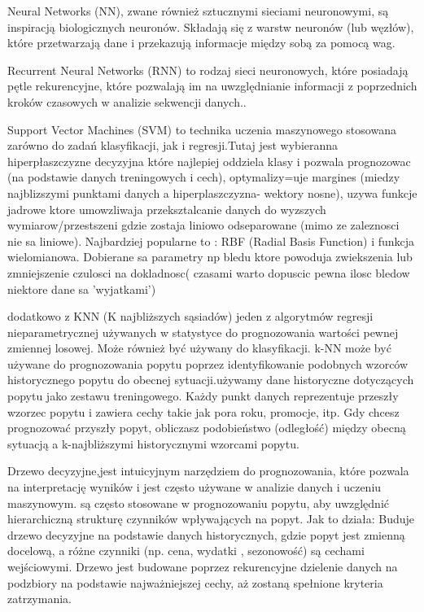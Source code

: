 Neural Networks (NN), zwane również sztucznymi sieciami neuronowymi, są inspiracją biologicznych neuronów. Składają się z warstw neuronów (lub węzłów), które przetwarzają dane i przekazują informacje między sobą za pomocą wag.

Recurrent Neural Networks (RNN) to rodzaj sieci neuronowych, które posiadają pętle rekurencyjne, które pozwalają im na uwzględnianie informacji z poprzednich kroków czasowych w analizie sekwencji danych..

Support Vector Machines (SVM) to technika uczenia maszynowego stosowana zarówno do zadań klasyfikacji, jak i regresji.Tutaj jest wybieranna hiperpłaszczyzne decyzyjna które najlepiej oddziela klasy i pozwala prognozowac (na podstawie danych treningowych i cech), optymalizy=uje margines (miedzy najblizszymi punktami danych a hiperplaszczyzna- wektory nosne), uzywa funkcje jadrowe ktore umowzliwaja przeksztalcanie danych do wyzszych wymiarow/przestszeni gdzie zostaja liniowo odseparowane (mimo ze zaleznosci nie sa liniowe). Najbardziej popularne to :  RBF (Radial Basis Function) i funkcja wielomianowa. Dobierane sa parametry np bledu ktore powoduja zwiekszenia lub zmniejszenie czulosci na dokladnosc( czasami warto dopuscic pewna ilosc bledow niektore dane sa 'wyjatkami')

dodatkowo z KNN (K najbliższych sąsiadów)  jeden z algorytmów regresji nieparametrycznej używanych w statystyce do prognozowania wartości pewnej zmiennej losowej. Może również być używany do klasyfikacji. k-NN może być używane do prognozowania popytu poprzez identyfikowanie podobnych wzorców historycznego popytu do obecnej sytuacji.używamy dane historyczne dotyczących popytu jako zestawu treningowego. Każdy punkt danych reprezentuje przeszły wzorzec popytu i zawiera cechy takie jak pora roku, promocje,  itp. Gdy chcesz prognozować przyszły popyt, obliczasz podobieństwo (odległość) między obecną sytuacją a k-najbliższymi historycznymi wzorcami popytu.

Drzewo decyzyjne,jest intuicyjnym narzędziem do prognozowania, które pozwala na interpretację wyników i jest często używane w analizie danych i uczeniu maszynowym. są często stosowane w prognozowaniu popytu, aby uwzględnić hierarchiczną strukturę czynników wpływających na popyt.
Jak to działa: Buduje drzewo decyzyjne na podstawie danych historycznych, gdzie popyt jest zmienną docelową, a różne czynniki (np. cena, wydatki , sezonowość) są cechami wejściowymi. Drzewo jest budowane poprzez rekurencyjne dzielenie danych na podzbiory na podstawie najważniejszej cechy, aż zostaną spełnione kryteria zatrzymania.

